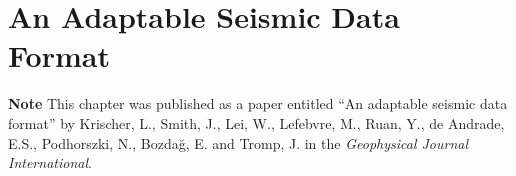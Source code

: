 \chapter{An Adaptable Seismic Data Format\label{ch:asdf}}

\textbf{Note}\newline
This chapter was published as a paper entitled ``An adaptable seismic data format''
by Krischer, L., Smith, J., Lei, W., Lefebvre, M., Ruan, Y., de Andrade, E.S.,
Podhorszki, N., Bozda\u g, E. and Tromp, J. in the
\textit{Geophysical Journal International}.









